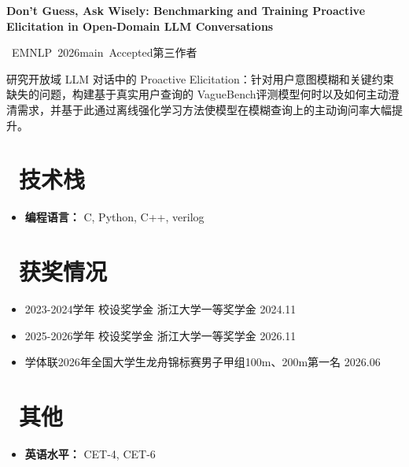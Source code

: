 \documentclass[11pt]{article}
\newlength{\intraProjectTitleSep}
\newcommand{\paperinfo}[4]{%
    \par\nobreak
    \noindent\hfill
    \mbox{#1\quad #2\quad #3\quad #4}%
    \par\vspace{\intraProjectTitleSep}
}
\begin{document}
\textbf{Don’t Guess, Ask Wisely: Benchmarking and Training Proactive Elicitation in Open-Domain LLM Conversations}
\paperinfo{ }{EMNLP 2026}{main Accepted}{第三作者}
研究开放域 LLM 对话中的 Proactive Elicitation：针对用户意图模糊和关键约束缺失的问题，构建基于真实用户查询的 VagueBench评测模型何时以及如何主动澄清需求，并基于此通过离线强化学习方法使模型在模糊查询上的主动询问率大幅提升。

\section{\makebox[\widthof{\faCogs}][c]{\color{CVBlue}\faCogs}\ 技术栈}
\begin{itemize}[nosep]
    \item \textbf{编程语言：} C, Python, C++, verilog
\end{itemize}
\section{\makebox[\widthof{\faGraduationCap}][c]{\color{CVBlue}\faList}\ 获奖情况}
\begin{itemize}
    \item 2023-2024学年 校设奖学金 浙江大学一等奖学金 \hfill 2024.11
    \item 2025-2026学年 校设奖学金 浙江大学一等奖学金 \hfill 2026.11
    \item 学体联2026年全国大学生龙舟锦标赛男子甲组100m、200m第一名 \hfill 2026.06
    
\end{itemize}
    
\section{\makebox[\widthof{\faInfo}][c]{\color{CVBlue}\faInfo}\ 其他}
\begin{itemize}[parsep=0.5ex]
    \item \textbf{英语水平：} CET-4, CET-6
\end{itemize}
\end{document}
